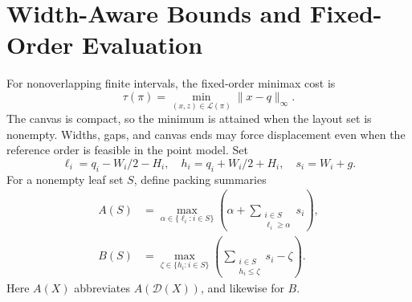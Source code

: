 \documentclass{vgtc}                %
\begin{document}
\section{Width-Aware Bounds and Fixed-Order Evaluation}\label{sec:width}
For nonoverlapping finite intervals, the fixed-order minimax cost is
\begin{equation}\label{eq:tau}
 \tau(\pi)=\min_{(x,z)\in\mathcal{L}(\pi)}\|x-q\|_\infty.
\end{equation}
The canvas is compact, so the minimum is attained when the layout set is nonempty. Widths, gaps, and canvas ends may force displacement even when the reference order is feasible in the point model. Set
\begin{equation}
 \ell_i=q_i-W_i/2-H_i,\quad h_i=q_i+W_i/2+H_i,
 \quad s_i=W_i+g.
\end{equation}
For a nonempty leaf set $S$, define packing summaries
\begin{equation}\label{eq:AB}
\begin{aligned}
 A(S)&=\max_{\alpha\in\{\ell_i:i\in S\}}
 \left(\alpha+\sum_{\substack{i\in S\\\ell_i\ge\alpha}}s_i\right),\\
 B(S)&=\max_{\zeta\in\{h_i:i\in S\}}
 \left(\sum_{\substack{i\in S\\h_i\le\zeta}}s_i-\zeta\right).
\end{aligned}
\end{equation}
Here $A(X)$ abbreviates $A(\mathcal{D}(X))$, and likewise for $B$.
\end{document}
